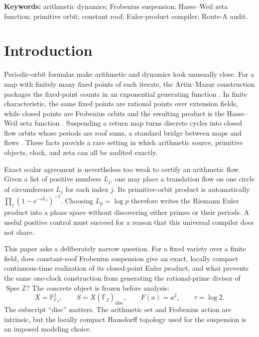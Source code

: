 \documentclass[11pt]{article}
\theoremstyle{definition}
\theoremstyle{remark}
\newcommand{\Z}{\mathbb{Z}}
\newcommand{\F}{\mathbb{F}}
\newcommand{\Spec}{\operatorname{Spec}}
\newcommand{\e}{\mathrm{e}}
\begin{document}
\medskip
\noindent\textbf{Keywords:} arithmetic dynamics; Frobenius suspension;
Hasse--Weil zeta function; primitive orbit; constant roof; Euler-product
compiler; Route-A audit.

\section{Introduction}
\label{sec:intro}

Periodic-orbit formulas make arithmetic and dynamics look unusually close.
For a map with finitely many fixed points of each iterate, the Artin--Mazur
construction packages the fixed-point counts in an exponential generating
function \citep{ArtinMazur1965}.  In finite characteristic, the same fixed
points are rational points over extension fields, while closed points are
Frobenius orbits and the resulting product is the Hasse--Weil zeta function
\citep{Deligne1974,Milne2013}.  Suspending a return map turns discrete cycles
into closed flow orbits whose periods are roof sums, a standard bridge between
maps and flows \citep{ParryPollicott1990}.  These facts provide a rare setting
in which arithmetic source, primitive objects, clock, and zeta can all be
audited exactly.

Exact scalar agreement is nevertheless too weak to certify an arithmetic
flow.  Given a list of positive numbers \(L_j\), one may place a translation
flow on one circle of circumference \(L_j\) for each index \(j\).  Its
primitive-orbit product is automatically
\(\prod_j(1-\e^{-sL_j})^{-1}\).  Choosing \(L_p=\log p\) therefore writes the
Riemann Euler product into a phase space without discovering either primes or
their periods.  A useful positive control must succeed for a reason that this
universal compiler does not share.

This paper asks a deliberately narrow question.  For a fixed variety over a
finite field, does constant-roof Frobenius suspension give an exact,
locally compact continuous-time realization of its closed-point Euler
product, and what prevents the same one-clock construction from generating
the rational-prime divisor of \(\Spec\Z\)?  The concrete object is frozen
before analysis:
\[
  X=\mathbb P^1_{\F_2},\qquad
  S=X(\overline{\F}_2)_{\mathrm{disc}},\qquad
  F(a)=a^2,\qquad \tau=\log2.
\]
The subscript ``disc'' matters.  The arithmetic set and Frobenius action are
intrinsic, but the locally compact Hausdorff topology used for the suspension
is an imposed modeling choice.
\end{document}
